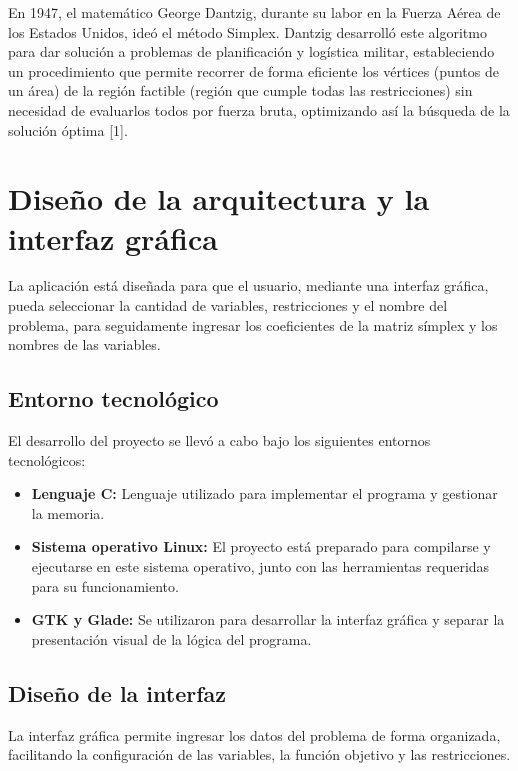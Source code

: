 \documentclass[11pt,oneside]{report}
\begin{document}
En 1947, el matemático George Dantzig, durante su labor en la Fuerza Aérea de los Estados Unidos, ideó el método Simplex. Dantzig desarrolló este algoritmo para dar solución a problemas de planificación y logística militar, estableciendo un procedimiento que permite recorrer de forma eficiente los vértices (puntos de un área) de la región factible (región que cumple todas las restricciones) sin necesidad de evaluarlos todos por fuerza bruta, optimizando así la búsqueda de la solución óptima [1].
\chapter{Diseño de la arquitectura y la interfaz gráfica}
La aplicación está diseñada para que el usuario, mediante una interfaz gráfica, pueda seleccionar la cantidad de variables, restricciones y el nombre del problema, para seguidamente ingresar los coeficientes de la matriz símplex y los nombres de las variables.

\section{Entorno tecnológico}
El desarrollo del proyecto se llevó a cabo bajo los siguientes entornos tecnológicos:
\begin{itemize}
\item \textbf{Lenguaje C:} Lenguaje utilizado para implementar el programa y gestionar la memoria.
\item \textbf{Sistema operativo Linux:} El proyecto está preparado para compilarse y ejecutarse en este sistema operativo, junto con las herramientas requeridas para su funcionamiento.
\item \textbf{GTK y Glade:} Se utilizaron para desarrollar la interfaz gráfica y separar la presentación visual de la lógica del programa.
\end{itemize}
\section{Diseño de la interfaz}
La interfaz gráfica permite ingresar los datos del problema de forma organizada, facilitando la configuración de las variables, la función objetivo y las restricciones.
\end{document}
